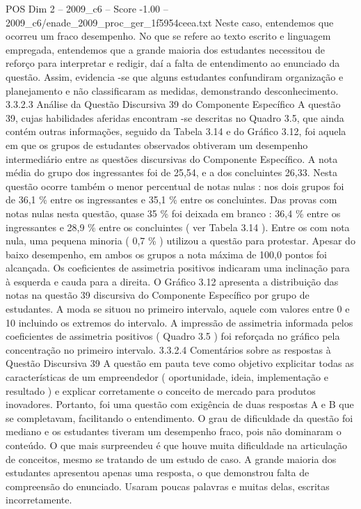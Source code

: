 \begin{textsample}{POS Dim 2 – 2009\_c6 – Score -1.00 – 2009\_c6/enade\_2009\_proc\_ger\_1f5954ceea.txt}
Neste caso, entendemos que ocorreu um fraco desempenho.
No que se refere ao texto escrito e linguagem empregada, entendemos que a grande maioria dos estudantes necessitou de reforço para interpretar e redigir, daí a falta de entendimento ao enunciado da questão.
Assim, evidencia -se que alguns estudantes confundiram organização e planejamento e não classificaram as medidas, demonstrando desconhecimento. 3.3.2.3 Análise da Questão Discursiva 39 do Componente Específico A questão 39, cujas habilidades aferidas encontram -se descritas no Quadro 3.5, que ainda contém outras informações, seguido da Tabela 3.14 e do Gráfico 3.12, foi aquela em que os grupos de estudantes observados obtiveram um desempenho intermediário entre as questões discursivas do Componente Específico.
A nota média do grupo dos ingressantes foi de 25,54, e a dos concluintes 26,33.
Nesta questão ocorre também o menor percentual de notas nulas : nos dois grupos foi de 36,1 \% entre os ingressantes e 35,1 \% entre os concluintes.
Das provas com notas nulas nesta questão, quase 35 \% foi deixada em branco : 36,4 \% entre os ingressantes e 28,9 \% entre os concluintes ( ver Tabela 3.14 ).
Entre os com nota nula, uma pequena minoria ( 0,7 \% ) utilizou a questão para protestar.
Apesar do baixo desempenho, em ambos os grupos a nota máxima de 100,0 pontos foi alcançada.
Os coeficientes de assimetria positivos indicaram uma inclinação para à esquerda e cauda para a direita.
O Gráfico 3.12 apresenta a distribuição das notas na questão 39 discursiva do Componente Específico por grupo de estudantes.
A moda se situou no primeiro intervalo, aquele com valores entre 0 e 10 incluindo os extremos do intervalo.
A impressão de assimetria informada pelos coeficientes de assimetria positivos ( Quadro 3.5 ) foi reforçada no gráfico pela concentração no primeiro intervalo. 3.3.2.4 Comentários sobre as respostas à Questão Discursiva 39 A questão em pauta teve como objetivo explicitar todas as características de um empreendedor ( oportunidade, ideia, implementação e resultado ) e explicar corretamente o conceito de mercado para produtos inovadores.
Portanto, foi uma questão com exigência de duas respostas A e B que se completavam, facilitando o entendimento.
O grau de dificuldade da questão foi mediano e os estudantes tiveram um desempenho fraco, pois não dominaram o conteúdo.
O que mais surpreendeu é que houve muita dificuldade na articulação de conceitos, mesmo se tratando de um estudo de caso.
A grande maioria dos estudantes apresentou apenas uma resposta, o que demonstrou falta de compreensão do enunciado.
Usaram poucas palavras e muitas delas, escritas incorretamente.

\end{textsample}
